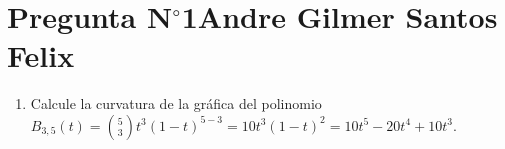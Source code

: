 \section{Pregunta N$^{\circ}$1\qquad Andre Gilmer Santos Felix}




\begin{frame}
    \begin{enumerate}\setcounter{enumi}{0}
        \item

              Calcule la curvatura de la gráfica del polinomio
              \begin{math}
                  B_{3,5}\left(t\right)=
                  \binom{5}{3}
                  t^{3}
                  \left(1-t\right)^{5-3}=
                  10t^{3}{\left(1-t\right)}^{2}=
                  10t^{5}-20t^{4}+10t^{3}
              \end{math}.
    \end{enumerate}


\end{frame}
